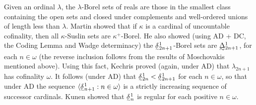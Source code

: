 \documentclass{book}%
\def\underTilde#1{{\baselineskip=0pt\vtop{\hbox{$#1$}\hbox{$\sim$}}}{}}
\def\undertilde#1{{\baselineskip=0pt\vtop
  {\hbox{$#1$}\hbox{$\scriptscriptstyle\sim$}}}{}}
\newcommand{\uTPi}{\underTilde{\Pi}}
\newcommand{\uTSigma}{\underTilde{\Sigma}}
\newcommand{\uTDelta}{\underTilde{\Delta}}
\newcommand{\utdelta}{\undertilde{\delta}}
\newcommand{\restrict}{\mathord{\upharpoonright}}
\newcommand{\less}{\mathord{<}}
\begin{document}
Given an ordinal $\lambda$, the $\lambda$-Borel sets of reals are those in the smallest class containing the
open sets and closed under complements and well-ordered unions of length less than $\lambda$.
Martin showed that if $\kappa$ is a cardinal of uncountable cofinality, then
all $\kappa$-Suslin sets are $\kappa^{+}$-Borel. He also showed (using AD + DC, the
Coding Lemma and Wadge determinacy) the $\utdelta^{1}_{2n+1}$-Borel sets are $\uTDelta^{1}_{2n+1}$, for each $n \in \omega$ (the
reverse inclusion follows from the results of Moschovakis  mentioned above).
Using this fact, Kechris proved (again, under AD) that
$\lambda_{2n+1}$ has cofinality $\omega$.
It follows (under AD) that $\undertilde{\delta}^{1}_{2n} <
\undertilde{\delta}^{1}_{2n+1}$ for each $n \in \omega$, so that
under AD the sequence $\langle \undertilde{\delta}^{1}_{n+1} : n
\in \omega \rangle$ is a strictly increasing sequence of successor cardinals. Kunen  showed that
$\utdelta^{1}_{n}$ is regular for each positive $n \in \omega$.






\end{document}
